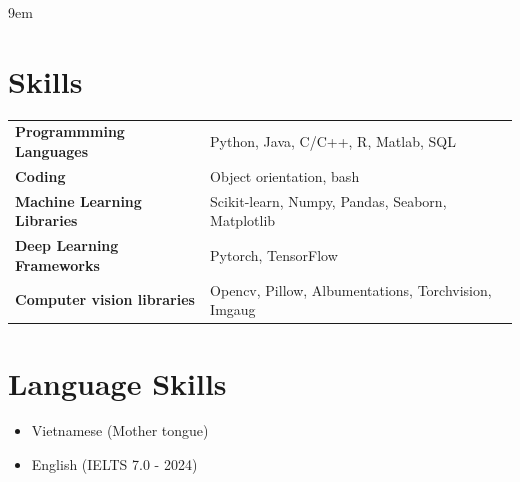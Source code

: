 \documentclass{clean_cv}
\begin{document}
\begin{datetabular}{9em}


\end{datetabular}


\section{Skills}
\begin{tabular}{l|l}
     \textbf{Programmming Languages} &  Python, Java, C/C++, R, Matlab, SQL\\
     \textbf{Coding} & Object orientation, bash \\
     \textbf{Machine Learning Libraries} & Scikit-learn, Numpy, Pandas, Seaborn, Matplotlib\\
     \textbf{Deep Learning Frameworks} & Pytorch, TensorFlow\\
     \textbf{Computer vision libraries} & Opencv, Pillow, Albumentations, Torchvision, Imgaug \\
\end{tabular}

\section{Language Skills}
\begin{itemize}
    \item Vietnamese (Mother tongue)
    \item English (IELTS 7.0 - 2024)
\end{itemize}
\end{document}

